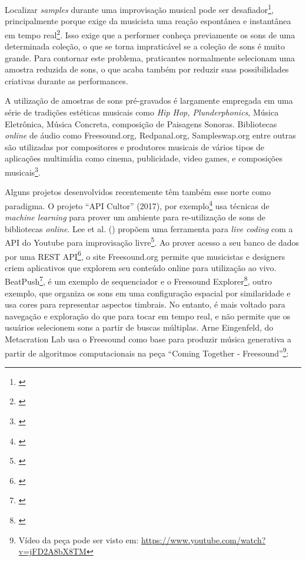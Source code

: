 Localizar \emph{samples} durante uma improvisação musical pode ser desafiador\footnote{\cite{Xambo2018}}, principalmente porque exige da musicista uma reação espontânea e instantânea em tempo real\footnote{\cite{canonne2011model}}. Isso exige que a performer conheça previamente os sons de uma determinada coleção, o que se torna impraticável se a coleção de sons é muito grande. Para contornar este problema, praticantes normalmente selecionam uma amostra reduzida de sons, o que acaba também por reduzir suas possibilidades criativas durante as performances.


A utilização de amostras de sons pré-gravados é largamente empregada em uma série de tradições estéticas musicais como \emph{Hip Hop, Plunderphonics}, Música Eletrônica, Música Concreta, composição de Paisagens Sonoras. Bibliotecas \emph{online} de áudio como Freesound.org, Redpanal.org, Sampleswap.org entre outras são utilizadas por compositores e produtores musicais de vários tipos de aplicações multimídia como cinema, publicidade, video games, e composições musicais\footnote{\cite{Roma2013}}. 

Alguns projetos desenvolvidos recentemente têm também esse norte como paradigma. O projeto ``API Cultor'' (2017), por exemplo\footnote{\cite{Ordiales2017}} usa técnicas de \emph{machine learning} para prover um ambiente para re-utilização de sons de bibliotecas \emph{online}. Lee et al. (\citeyear{Lee}) propõem uma ferramenta para \emph{live coding} com a API do Youtube para improvisação livre\footnote{\cite{Lee}}. Ao prover acesso a seu banco de dados por uma REST API\footnote{\cite{Akkermans2011}}, o site Freesound.org permite que musicistas e designers criem aplicativos que explorem seu conteúdo online para utilização ao vivo. BeatPush\footnote{\cite{Feenstra2016}}, é um exemplo de sequenciador e o Freesound Explorer\footnote{\cite{Font2016}}, outro exemplo, que organiza os sons em uma configuração espacial por similaridade e usa cores para representar aspectos timbrais. No entanto, é mais voltado para navegação e exploração do que para tocar em tempo real, e não permite que os usuários selecionem sons a partir de buscas múltiplas. Arne Eingenfeld, do Metacration Lab usa o Freesound como base para produzir música generativa a partir de algoritmos computacionais na peça ``Coming Together - Freesound''\footnote{Vídeo da peça pode ser visto em: \url{https://www.youtube.com/watch?v=jFD2A8bX8TM}}:

